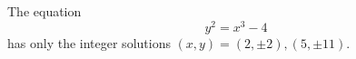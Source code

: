 \begin{proposition}
    The equation
\[
    y^2=x^3-4
\]
    has only the integer solutions $(x,y)=(2,\pm2),(5,\pm11)$.
\end{proposition}
